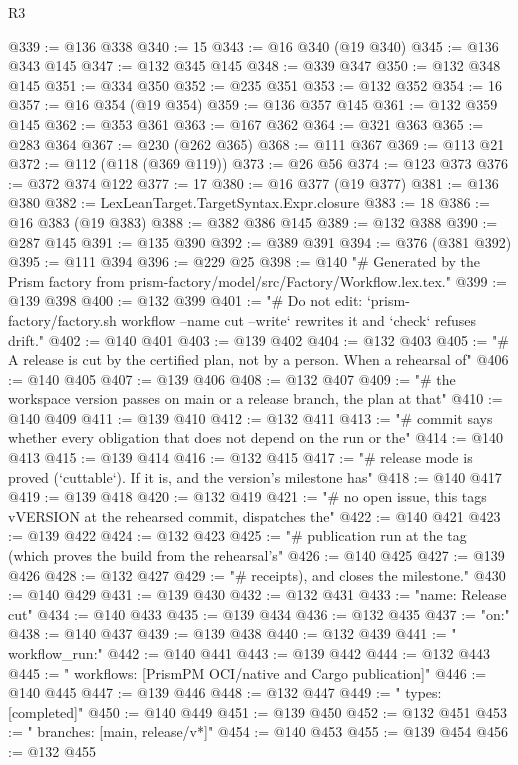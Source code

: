 \begin{lexlean}{R3}
\begin{coremodule}
@339 := @136 @338
@340 := 15
@343 := @16 @340 (@19 @340)
@345 := @136 @343 @145
@347 := @132 @345 @145
@348 := @339 @347
@350 := @132 @348 @145
@351 := @334 @350
@352 := @235 @351
@353 := @132 @352
@354 := 16
@357 := @16 @354 (@19 @354)
@359 := @136 @357 @145
@361 := @132 @359 @145
@362 := @353 @361
@363 := @167 @362
@364 := @321 @363
@365 := @283 @364
@367 := @230 (@262 @365)
@368 := @111 @367
@369 := @113 @21
@372 := @112 (@118 (@369 @119))
@373 := @26 @56
@374 := @123 @373
@376 := @372 @374 @122
@377 := 17
@380 := @16 @377 (@19 @377)
@381 := @136 @380
@382 := LexLeanTarget.TargetSyntax.Expr.closure
@383 := 18
@386 := @16 @383 (@19 @383)
@388 := @382 @386 @145
@389 := @132 @388
@390 := @287 @145
@391 := @135 @390
@392 := @389 @391
@394 := @376 (@381 @392)
@395 := @111 @394
@396 := @229 @25
@398 := @140
    "# Generated by the Prism factory from prism-factory/model/src/Factory/Workflow.lex.tex."
@399 := @139 @398
@400 := @132 @399
@401 := "# Do not edit: `prism-factory/factory.sh workflow --name cut --write` rewrites it and `check` refuses drift."
@402 := @140 @401
@403 := @139 @402
@404 := @132 @403
@405 := "# A release is cut by the certified plan, not by a person. When a rehearsal of"
@406 := @140 @405
@407 := @139 @406
@408 := @132 @407
@409 := "# the workspace version passes on main or a release branch, the plan at that"
@410 := @140 @409
@411 := @139 @410
@412 := @132 @411
@413 := "# commit says whether every obligation that does not depend on the run or the"
@414 := @140 @413
@415 := @139 @414
@416 := @132 @415
@417 := "# release mode is proved (`cuttable`). If it is, and the version's milestone has"
@418 := @140 @417
@419 := @139 @418
@420 := @132 @419
@421 := "# no open issue, this tags vVERSION at the rehearsed commit, dispatches the"
@422 := @140 @421
@423 := @139 @422
@424 := @132 @423
@425 := "# publication run at the tag (which proves the build from the rehearsal's"
@426 := @140 @425
@427 := @139 @426
@428 := @132 @427
@429 := "# receipts), and closes the milestone."
@430 := @140 @429
@431 := @139 @430
@432 := @132 @431
@433 := "name: Release cut"
@434 := @140 @433
@435 := @139 @434
@436 := @132 @435
@437 := "on:"
@438 := @140 @437
@439 := @139 @438
@440 := @132 @439
@441 := "  workflow_run:"
@442 := @140 @441
@443 := @139 @442
@444 := @132 @443
@445 := "    workflows: [PrismPM OCI/native and Cargo publication]"
@446 := @140 @445
@447 := @139 @446
@448 := @132 @447
@449 := "    types: [completed]"
@450 := @140 @449
@451 := @139 @450
@452 := @132 @451
@453 := "    branches: [main, release/v*]"
@454 := @140 @453
@455 := @139 @454
@456 := @132 @455

\end{coremodule}
\end{lexlean}
